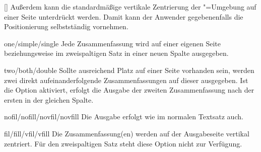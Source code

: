 \documentclass[%
  english,ngerman,%
  headings=optiontoheadandtoc,captions=tableheading,numbers=noenddot,%
  chapterpage,cdfoot,%
]{tudscrman}
\begin{document}
\begin{Declaration}{[\PSet]}
Außerdem kann die standardmäßige vertikale Zentrierung der 
"=Umgebung auf einer Seite unterdrückt werden. Damit kann 
der Anwender gegebenenfalls die Positionierung selbstständig vornehmen. 
%
\begin{values}
\item[one/simple/single]Jede Zusammenfassung wird auf einer eigenen Seite
  beziehungsweise im zweispaltigen Satz in einer neuen Spalte ausgegeben.
\item[two/both/double]
  Sollte ausreichend Platz auf einer Seite vorhanden sein, werden zwei direkt 
  aufeinanderfolgende Zusammenfassungen auf dieser ausgegeben. Ist die Option 
   aktiviert, erfolgt die Ausgabe der zweiten Zusammenfassung 
  nach der ersten in der gleichen Spalte.
\item[nofil/nofill/novfil/novfill]
  Die Ausgabe erfolgt wie im normalen Textsatz auch.
\item[fil/fill/vfil/vfill]
  Die Zusammenfassung(en) werden auf der Ausgabeseite vertikal zentriert. Für 
  den zweispaltigen Satz steht diese Option nicht zur Verfügung.
\end{values}
\end{Declaration}
\end{document}
